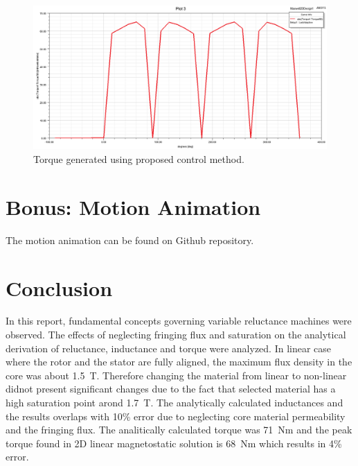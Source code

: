 \documentclass{article}
\begin{document}
\begin{figure}[H]
	\centering
	\includegraphics[width=1\linewidth]{Figurler/Q4/abstorque}
	\caption{Torque generated using proposed control method.}
	\label{fig:abstorque}
\end{figure}

\section{Bonus: Motion Animation}
The motion animation can be found on Github repository.

\section{Conclusion}

In this report, fundamental concepts governing variable reluctance machines were observed. The effects of neglecting fringing flux and saturation on the analytical derivation of reluctance, inductance and torque were analyzed. In linear case where the rotor and the stator are fully aligned, the maximum flux density in the core was about 1.5~T. Therefore changing the material from linear to non-linear didnot present significant changes due to the fact that selected material has a high saturation point arond 1.7~T. The analytically calculated inductances and the results overlaps with 10\% error due to neglecting core material permeability and the fringing flux. The analitically calculated torque was 71~Nm and the peak torque found in 2D linear magnetostatic solution is 68~Nm which results in 4\% error.
\end{document}
